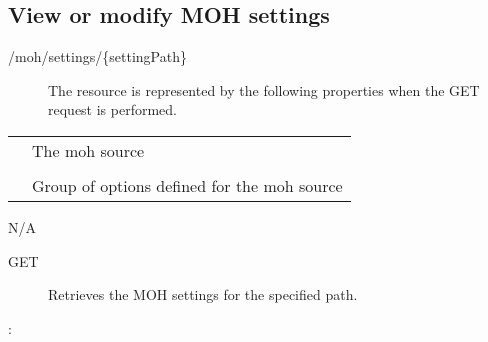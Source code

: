 \documentclass[letterpaper,10pt,english]{sphinxmanual}
\begin{document}
\subsection{View or modify MOH settings}
\label{\detokenize{restapi:view-or-modify-moh-settings}}
 /moh/settings/\{settingPath\}
\begin{description}
\item[{}] \leavevmode
The resource is represented by the following properties when the GET request is performed.

\end{description}


\begin{savenotes}\sphinxattablestart
\centering
\begin{tabulary}{\linewidth}[t]{|T|T|}
\hline

&
\\
\hline
{}
&
The moh source
\\
\hline
{}
&\\
\hline
{}
&
Group of options defined for the moh source
\\
\hline
\end{tabulary}
\par
\sphinxattableend\end{savenotes}

 N/A
\begin{description}
\item[{ GET}] \leavevmode
Retrieves the MOH settings for the specified path.

\end{description}

:
\end{document}
